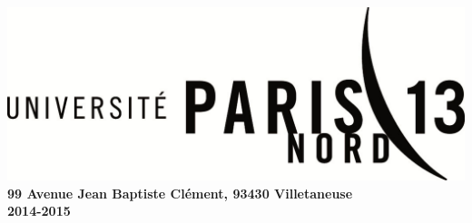 \begin{center}
\vspace{1.0cm}
\includegraphics[scale=0.25]{project/images/logoUP13}\\
\large{\textbf{99 Avenue Jean Baptiste Clément, 93430 Villetaneuse}}
\large{\textbf{\\2014-2015}}\\[0.5cm]

\newpage

\end{center}